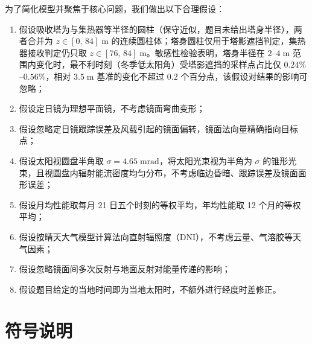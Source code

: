 \documentclass[12pt,a4paper,fontset=fandol]{ctexart}
\begin{document}
为了简化模型并聚焦于核心问题，我们做出以下合理假设：
\begin{enumerate}
    \item 假设吸收塔为与集热器等半径的圆柱（保守近似，题目未给出塔身半径），两者合并为 $z \in [0,\,84]\;\mathrm{m}$ 的连续圆柱体；塔身圆柱仅用于塔影遮挡判定，集热器接收判定仍只取 $z \in [76,\,84]\;\mathrm{m}$。敏感性检验表明，塔身半径在 $2$--$4\;\mathrm{m}$ 范围内变化时，最不利时刻（冬季低太阳角）受塔影遮挡的采样点占比仅 $0.24\%$--$0.56\%$，相对 $3.5\;\mathrm{m}$ 基准的变化不超过 $0.2$ 个百分点，该假设对结果的影响可忽略；
    \item 假设定日镜为理想平面镜，不考虑镜面弯曲变形；
    \item 假设忽略定日镜跟踪误差及风载引起的镜面偏转，镜面法向量精确指向目标点；
    \item 假设太阳视圆盘半角取 $\sigma = 4.65\;\mathrm{mrad}$，将太阳光束视为半角为 $\sigma$ 的锥形光束，且视圆盘内辐射能流密度均匀分布，不考虑临边昏暗、跟踪误差及镜面面形误差；
    \item 假设月均性能取每月 21 日五个时刻的等权平均，年均性能取 12 个月的等权平均；
    \item 假设按晴天大气模型计算法向直射辐照度（DNI），不考虑云量、气溶胶等天气因素；
    \item 假设忽略镜面间多次反射与地面反射对能量传递的影响；
    \item 假设题目给定的当地时间即为当地太阳时，不额外进行经度时差修正。
\end{enumerate}

\section{符号说明}
\end{document}
